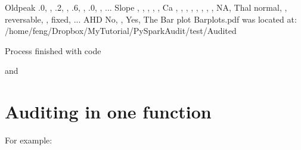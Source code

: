 \documentclass[letterpaper,12pt,english]{sphinxmanual}
\begin{document}
\begin{sphinxVerbatim}[commandchars=\\\{\}]
     Oldpeak  \PYG{o}{[}\PYG{o}{[}.0, \PYG{o}{]}, \PYG{o}{[}.2, \PYG{o}{]}, \PYG{o}{[}.6, \PYG{o}{]}, \PYG{o}{[}.0, \PYG{o}{]}, \PYG{o}{[}...
      Slope                      \PYG{o}{[}\PYG{o}{[}, \PYG{o}{]}, \PYG{o}{[}, \PYG{o}{]}, \PYG{o}{[}, \PYG{o}{]}\PYG{o}{]}
         Ca     \PYG{o}{[}\PYG{o}{[}, \PYG{o}{]}, \PYG{o}{[}, \PYG{o}{]}, \PYG{o}{[}, \PYG{o}{]}, \PYG{o}{[}, \PYG{o}{]}, \PYG{o}{[}NA, \PYG{o}{]}\PYG{o}{]}
       Thal  \PYG{o}{[}\PYG{o}{[}normal, \PYG{o}{]}, \PYG{o}{[}reversable, \PYG{o}{]}, \PYG{o}{[}fixed, \PYG{o}{]}...
        AHD                            \PYG{o}{[}\PYG{o}{[}No, \PYG{o}{]}, \PYG{o}{[}Yes, \PYG{o}{]}\PYG{o}{]}
The Bar plot Bar\PYGZus{}plots.pdf was located at:
/home/feng/Dropbox/MyTutorial/PySparkAudit/test/Audited

Process finished with  code 
\end{sphinxVerbatim}

and
\begin{quote}

\begin{figure}[htbp]
\centering

\noindent{}
\end{figure}
\end{quote}


\section{Auditing in one function}
\label{\detokenize{demo:auditing-in-one-function}}
For example:
\end{document}
